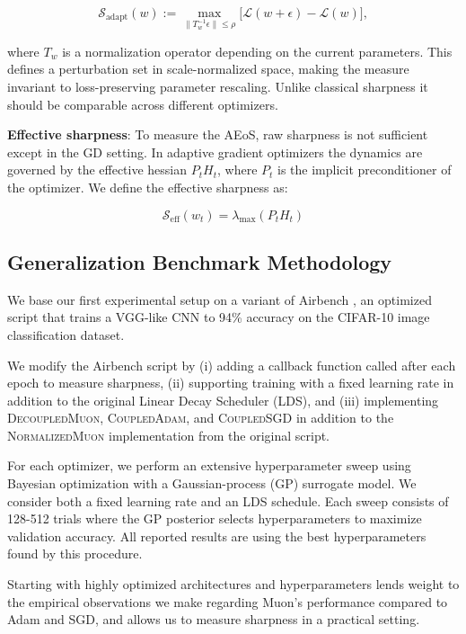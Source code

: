\documentclass{article}
\theoremstyle{plain}
\theoremstyle{definition}
\theoremstyle{remark}
\begin{document}
\begin{equation}
\mathcal S_{\text{adapt}}(w)
:= \max_{\|T_w^{-1}\epsilon\|\le\rho}
\big[\mathcal{L}(w+\epsilon)-\mathcal{L}(w)\big],
\end{equation}

where $T_w$ is a normalization operator depending on the current parameters. This defines a perturbation set in scale-normalized space, making the measure invariant to loss-preserving parameter rescaling. Unlike classical sharpness it should be comparable across different optimizers.

\textbf{Effective sharpness}: To measure the AEoS, raw sharpness is not sufficient except in the GD setting. In adaptive gradient optimizers the dynamics are governed by the effective hessian $P_tH_t$, where $P_t$ is the implicit preconditioner of the optimizer. We define the effective sharpness as:

\begin{equation}
\mathcal{S}_{\text{eff}}(w_t) = \lambda_{\text{max}}(P_tH_t)
\end{equation}

\subsection{Generalization Benchmark Methodology}
We base our first experimental setup on a variant of Airbench \cite{jordan2024airbench}, an optimized script that trains a VGG-like CNN to 94\% accuracy on the CIFAR-10 \cite{cifar10} image classification dataset.

We modify the Airbench script by (i) adding a callback function called after each epoch to measure sharpness, (ii) supporting training with a fixed learning rate in addition to the original Linear Decay Scheduler (LDS), and (iii) implementing \textsc{DecoupledMuon}, \textsc{CoupledAdam}, and \textsc{CoupledSGD} in addition to the \textsc{NormalizedMuon} implementation from the original script. 

For each optimizer, we perform an extensive hyperparameter sweep using Bayesian optimization with a Gaussian-process (GP) surrogate model. We consider both a fixed learning rate and an LDS schedule. Each sweep consists of 128-512 trials where the GP posterior selects hyperparameters to maximize validation accuracy. All reported results are using the best hyperparameters found by this procedure. 

Starting with highly optimized architectures and hyperparameters lends weight to the empirical observations we make regarding Muon's performance compared to Adam and SGD, and allows us to measure sharpness in a practical setting.
\end{document}
